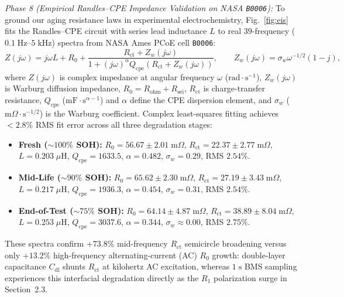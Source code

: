 \documentclass[10pt,a4paper]{article}
\providecommand{\upmu}{\mu}
\begin{document}
\emph{Phase 8 (Empirical Randles--CPE Impedance Validation on NASA \texttt{B0006}):} To ground our aging resistance laws in experimental electrochemistry, Fig.~\ref{fig:eis} fits the Randles--CPE circuit with series lead inductance $L$ to real $39$-frequency ($0.1\;\mathrm{Hz}\text{--}5\;\mathrm{kHz}$) spectra from NASA Ames PCoE cell \texttt{B0006}:
\begin{equation}\label{eqn:eis_randles}
Z(j\omega) = j\omega L + R_0 + \frac{R_{\text{ct}} + Z_w(j\omega)}{1 + (j\omega)^\alpha Q_{\text{cpe}} \left(R_{\text{ct}} + Z_w(j\omega)\right)}, \qquad Z_w(j\omega) = \sigma_w \omega^{-1/2}(1 - j),
\end{equation}
where $Z(j\omega)$ is complex impedance at angular frequency $\omega$ ($\mathrm{rad}\cdot\mathrm{s}^{-1}$), $Z_w(j\omega)$ is Warburg diffusion impedance, $R_0 = R_{\text{ohm}} + R_{\text{sei}}$, $R_{\text{ct}}$ is charge-transfer resistance, $Q_{\text{cpe}}$ ($\mathrm{mF}\cdot\mathrm{s}^{\alpha-1}$) and $\alpha$ define the CPE dispersion element, and $\sigma_w$ ($\mathrm{m}\Omega\cdot\mathrm{s}^{-1/2}$) is the Warburg coefficient. Complex least-squares fitting achieves $<2.8\%$ RMS fit error across all three degradation stages:
\begin{itemize}
\item \textbf{Fresh ($\sim 100\%$ SOH):} $R_0 = 56.67\pm 2.01\;\mathrm{m}\Omega$, $R_{\text{ct}} = 22.37\pm 2.77\;\mathrm{m}\Omega$, $L = 0.203\;\upmu\mathrm{H}$, $Q_{\text{cpe}} = 1633.5$, $\alpha = 0.482$, $\sigma_w = 0.29$, RMS $2.54\%$.
\item \textbf{Mid-Life ($\sim 90\%$ SOH):} $R_0 = 65.62\pm 2.30\;\mathrm{m}\Omega$, $R_{\text{ct}} = 27.19\pm 3.43\;\mathrm{m}\Omega$, $L = 0.217\;\upmu\mathrm{H}$, $Q_{\text{cpe}} = 1936.3$, $\alpha = 0.454$, $\sigma_w = 0.31$, RMS $2.54\%$.
\item \textbf{End-of-Test ($\sim 75\%$ SOH):} $R_0 = 64.14\pm 4.87\;\mathrm{m}\Omega$, $R_{\text{ct}} = 38.89\pm 8.04\;\mathrm{m}\Omega$, $L = 0.253\;\upmu\mathrm{H}$, $Q_{\text{cpe}} = 3037.6$, $\alpha = 0.344$, $\sigma_w \approx 0.00$, RMS $2.75\%$.
\end{itemize}
These spectra confirm $+73.8\%$ mid-frequency $R_{\text{ct}}$ semicircle broadening versus only $+13.2\%$ high-frequency alternating-current (AC) $R_0$ growth: double-layer capacitance $C_{\text{dl}}$ shunts $R_{\text{ct}}$ at kilohertz AC excitation, whereas $1\;\mathrm{s}$ BMS sampling experiences this interfacial degradation directly as the $R_1$ polarization surge in Section~2.3.
\end{document}
